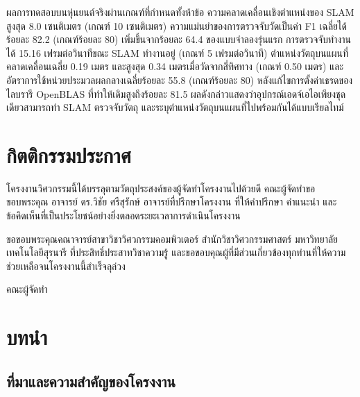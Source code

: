 \documentclass[a4paper,12pt]{report}
\newcounter{savedfront}
\newcommand{\savefrontpage}{\setcounter{savedfront}{\value{page}}}
\begin{document}
ผลการทดสอบบนหุ่นยนต์จริงผ่านเกณฑ์ที่กำหนดทั้งห้าข้อ
ความคลาดเคลื่อนเชิงตำแหน่งของ SLAM สูงสุด 8.0 เซนติเมตร (เกณฑ์ 10 เซนติเมตร)
ความแม่นยำของการตรวจจับวัดเป็นค่า F1 เฉลี่ยได้ร้อยละ 82.2 (เกณฑ์ร้อยละ 80)
เพิ่มขึ้นจากร้อยละ 64.4 ของแบบจำลองรุ่นแรก
การตรวจจับทำงานได้ 15.16 เฟรมต่อวินาทีขณะ SLAM ทำงานอยู่ (เกณฑ์ 5 เฟรมต่อวินาที)
ตำแหน่งวัตถุบนแผนที่คลาดเคลื่อนเฉลี่ย 0.19 เมตร และสูงสุด 0.34 เมตรเมื่อวัดจากสี่ทิศทาง
(เกณฑ์ 0.50 เมตร)
และอัตราการใช้หน่วยประมวลผลกลางเฉลี่ยร้อยละ 55.8 (เกณฑ์ร้อยละ 80)
หลังแก้ไขการตั้งค่าเธรดของไลบรารี OpenBLAS ที่ทำให้เดิมสูงถึงร้อยละ 81.5
ผลดังกล่าวแสดงว่าอุปกรณ์เอดจ์เอไอเพียงชุดเดียวสามารถทำ SLAM ตรวจจับวัตถุ
และระบุตำแหน่งวัตถุบนแผนที่ไปพร้อมกันได้แบบเรียลไทม์

\chapter*{กิตติกรรมประกาศ}

โครงงานวิศวกรรมนี้ได้บรรลุตามวัตถุประสงค์ของผู้จัดทำโครงงานไปด้วยดี
คณะผู้จัดทำขอขอบพระคุณ อาจารย์ ดร.วิชัย ศรีสุรักษ์ อาจารย์ที่ปรึกษาโครงงาน
ที่ให้คำปรึกษา คำแนะนำ และข้อคิดเห็นที่เป็นประโยชน์อย่างยิ่งตลอดระยะเวลาการดำเนินโครงงาน

ขอขอบพระคุณคณาจารย์สาขาวิชาวิศวกรรมคอมพิวเตอร์ สำนักวิชาวิศวกรรมศาสตร์
มหาวิทยาลัยเทคโนโลยีสุรนารี ที่ประสิทธิ์ประสาทวิชาความรู้
และขอขอบคุณผู้ที่มีส่วนเกี่ยวข้องทุกท่านที่ให้ความช่วยเหลือจนโครงงานนี้สำเร็จลุล่วง

\vspace{1cm}
\begin{flushright}
คณะผู้จัดทำ
\end{flushright}

\clearpage
\tableofcontents
\clearpage
\listoftables
\clearpage
\listoffigures

\clearpage
\savefrontpage


\chapter{บทนำ}

\section{ที่มาและความสำคัญของโครงงาน}
\end{document}

